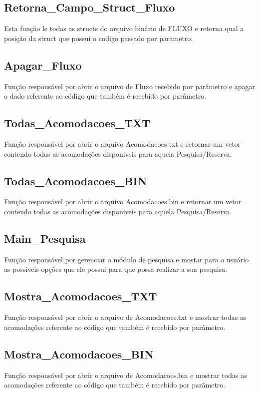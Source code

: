 \documentclass{article}
\begin{document}
\subsection{Retorna\_Campo\_Struct\_Fluxo}
	Esta função le todas as structs do arquivo binário de FLUXO e retorna qual a posição da struct que possui o codigo passado por parametro.
	
\subsection{Apagar\_Fluxo}
	Função responsável por abrir o arquivo de Fluxo recebido por parâmetro e apagar o dado referente ao código que também é recebido por parâmetro.
	
\subsection{Todas\_Acomodacoes\_TXT}
	Função responsável por abrir o arquivo Acomodacoes.txt e retornar um vetor contendo todas as acomodações disponiveis para aquela Pesquisa/Reserva.

\subsection{Todas\_Acomodacoes\_BIN}
	Função responsável por abrir o arquivo Acomodacoes.bin e retornar um vetor contendo todas as acomodações disponiveis para aquela Pesquisa/Reserva.

\subsection{Main\_Pesquisa}
	Função responsável por gerenciar o módulo de pesquisa e mostar para o usuário as possiveis opções que ele possui para que possa realizar a sua pesquisa.

\subsection{Mostra\_Acomodacoes\_TXT}
	Função responsável por abrir o arquivo de Acomodacoes.txt e mostrar todas as acomodações referente ao código que também é recebido por parâmetro.
	
\subsection{Mostra\_Acomodacoes\_BIN}
	Função responsável por abrir o arquivo de Acomodacoes.bin e mostrar todas as acomodações referente ao código que também é recebido por parâmetro.
\end{document}
